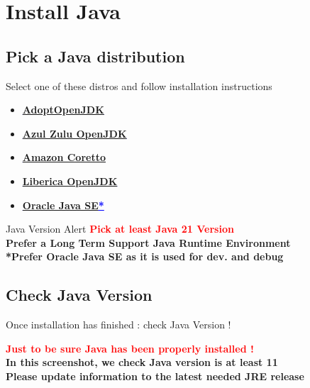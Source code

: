 \documentclass[a4paper,11pt]{beamer}
\begin{document}
\section{Install Java}
\subsection{Pick a Java distribution}
\begin{frame}
\begin{block}{Select one of these distros and follow installation instructions}
    \begin{itemize}
        \item \textcolor{blue}{\textbf{\underline{\href{https://adoptopenjdk.net}{AdoptOpenJDK}}}}
        \item \textcolor{blue}{\textbf{\underline{\href{https://www.azul.com/downloads/?package=jre}{Azul Zulu OpenJDK}}}}
        \item \textcolor{blue}{\textbf{\underline{\href{https://docs.aws.amazon.com/corretto/index.html}{Amazon Coretto}}}}
        \item \textcolor{blue}{\textbf{\underline{\href{https://bell-sw.com}{Liberica OpenJDK}}}}
        \item \textcolor{blue}{\textbf{\underline{\href{https://www.oracle.com/fr/java/technologies/javase-downloads.html}{Oracle Java SE}*}}}
    \end{itemize}
\end{block}
\begin{alertblock}{Java Version Alert}
    \centering
    \textcolor{red}{\textbf{Pick at least Java 21 Version}}\\
    \textbf{Prefer a Long Term Support Java Runtime Environment}\\
     \textbf{*Prefer Oracle Java SE as it is used for dev. and debug}\\
\end{alertblock}
\end{frame}


\subsection{Check Java Version}
\begin{frame}
\begin{exampleblock}{Once installation has finished : check Java Version !}
\end{exampleblock}
\centering
    \textcolor{red}{\textbf{Just to be sure Java has been properly installed !}}\\
    \vspace{0.5cm}
    \textbf{In this screenshot, we check Java version is at least 11}\\
    \textbf{Please update information to the latest needed JRE release}
\end{frame}
\end{document}
